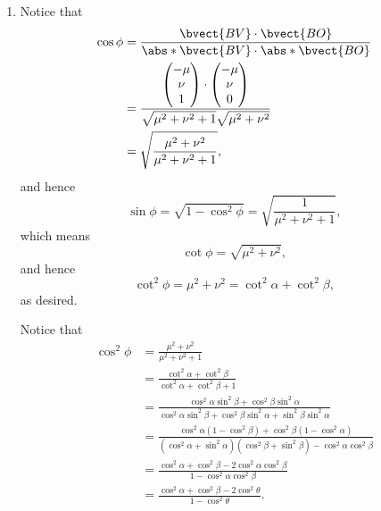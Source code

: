 \begin{enumerate}
    \item Notice that
          \begin{align*}
              \cos \phi & = \frac{\bvect{BV} \cdot \bvect{BO}}{\abs*{\bvect{BV}} \cdot \abs*{\bvect{BO}}}           \\
                        & = \frac{\begin{pmatrix}
                                          -\mu \\
                                          \nu  \\
                                          1
                                      \end{pmatrix} \cdot \begin{pmatrix}
                                                              -\mu \\
                                                              \nu  \\
                                                              0
                                                          \end{pmatrix}}{\sqrt{\mu^2 + \nu^2 + 1} \sqrt{\mu^2 + \nu^2}} \\
                        & = \sqrt{\frac{\mu^2 + \nu^2}{\mu^2 + \nu^2 + 1}},
          \end{align*}
          and hence
          \[
              \sin \phi = \sqrt{1 - \cos^2 \phi} = \sqrt{\frac{1}{\mu^2 + \nu^2 + 1}},
          \]
          which means
          \[
              \cot \phi = \sqrt{\mu^2 + \nu^2},
          \]
          and hence
          \[
              \cot^2 \phi = \mu^2 + \nu^2 = \cot^2 \alpha + \cot^2 \beta,
          \]
          as desired.

          Notice that
          \begin{align*}
              \cos^2 \phi & = \frac{\mu^2 + \nu^2}{\mu^2 + \nu^2 + 1}                                                                                                                               \\
                          & = \frac{\cot^2 \alpha + \cot^2 \beta}{\cot^2 \alpha + \cot^2 \beta + 1}                                                                                                 \\
                          & = \frac{\cos^2 \alpha \sin^2 \beta  + \cos^2 \beta \sin^2 \alpha}{\cos^2 \alpha \sin^2 \beta + \cos^2 \beta \sin^2 \alpha + \sin^2 \beta \sin^2 \alpha}                 \\
                          & = \frac{\cos^2 \alpha (1 - \cos^2 \beta) + \cos^2 \beta (1 - \cos^2 \alpha)}{(\cos^2 \alpha + \sin^2 \alpha)(\cos^2 \beta + \sin^2 \beta) - \cos^2 \alpha \cos^2 \beta} \\
                          & = \frac{\cos^2 \alpha + \cos^2 \beta - 2 \cos^2\alpha \cos^2\beta}{1 - \cos^2 \alpha \cos^2 \beta}                                                                      \\
                          & = \frac{\cos^2 \alpha + \cos^2 \beta - 2 \cos^2\theta}{1 - \cos^2\theta}.
          \end{align*}


\end{enumerate}
